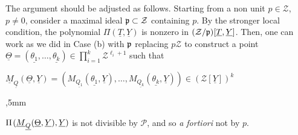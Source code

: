 \documentclass[11pt,a4paper,reqno]{amsart}
\newtheorem{thm}{Theorem}[section]
\theoremstyle{definition}
\begin{document}
The argument should be adjusted as follows. Starting from a non unit $p\in {\mathcal Z}$, $p\not=0$, consider a maximal ideal ${\frak p}\subset {\mathcal Z}$ containing $p$. By the stronger local condition, the polynomial $\Pi(\underline T,\underline Y)$ is nonzero in $({\mathcal Z}/{\frak p})[\underline T,\underline Y]$. Then,
one can work as we did in Case (b) with ${\frak p}$ replacing $p{\mathcal Z}$ to construct a point ${\underline{\Theta}} = (\underline {\theta_1},\ldots,\underline{\theta_k})\in \prod_{i=1}^k {\mathcal Z}^{\ell_i+1}$ such that 
 \vskip 1mm
 
 \centerline{$\underline M_{\underline Q}( \underline{\Theta},\underline Y)=(M_{\underline {Q_1}}({\underline{\theta_1}}, \underline Y), \ldots, M_{\underline {Q_k}}(\underline{\theta_k}, \underline Y)) \in ({\mathcal Z}[\underline Y])^k$}
 
 ,5mm

 \noindent
 $\Pi\hskip 1pt (\underline M_{\underline Q}(\underline{\Theta},\underline Y),\underline Y)$ is not divisible by ${\mathcal P}$, and so \emph{a fortiori} not by $p$. 




\end{document}
